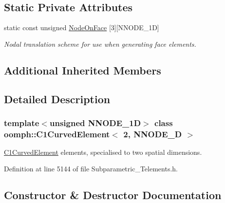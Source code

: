 \subsection*{Static Private Attributes}
\begin{DoxyCompactItemize}
\item 
static const unsigned \hyperlink{classoomph_1_1C1CurvedElement_3_012_00_01NNODE__1D_01_4_a7af342e536c2474e8377eab50c29415a}{Node\+On\+Face} \mbox{[}3\mbox{]}\mbox{[}N\+N\+O\+D\+E\+\_\+1D\mbox{]}
\begin{DoxyCompactList}\small\item\em Nodal translation scheme for use when generating face elements. \end{DoxyCompactList}\end{DoxyCompactItemize}
\subsection*{Additional Inherited Members}


\subsection{Detailed Description}
\subsubsection*{template$<$unsigned N\+N\+O\+D\+E\+\_\+1D$>$\newline
class oomph\+::\+C1\+Curved\+Element$<$ 2, N\+N\+O\+D\+E\+\_\+D $>$}

\hyperlink{classoomph_1_1C1CurvedElement}{C1\+Curved\+Element} elements, specialised to two spatial dimensions. 

Definition at line 5144 of file Subparametric\+\_\+\+Telements.\+h.



\subsection{Constructor \& Destructor Documentation}
\mbox{\label{classoomph_1_1C1CurvedElement_3_012_00_01NNODE__1D_01_4_a4e389db9bdba834069675c79661e15fc}} 
